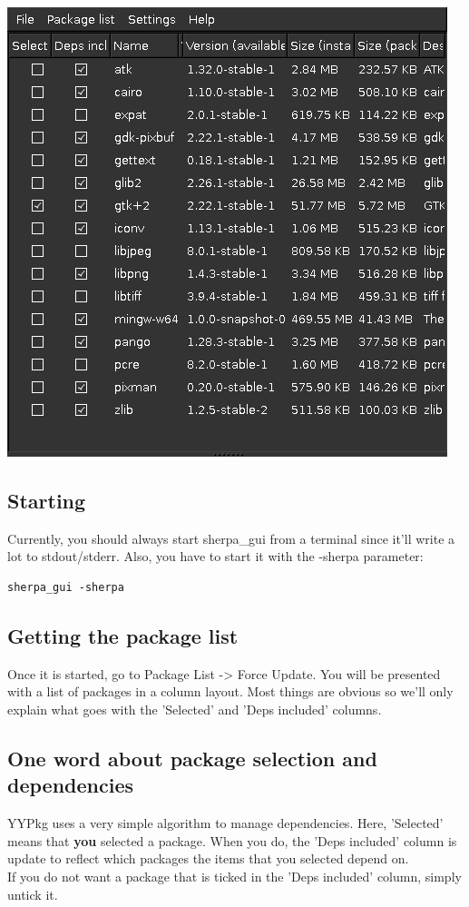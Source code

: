 \documentclass[a4paper]{article}
\begin{document}
\begin{center}
  \includegraphics{../screenshots/sherpa_gui_1.png}
\end{center}

\subsection{Starting}
Currently, you should always start sherpa\_gui from a terminal since it'll write a lot to stdout/stderr. Also, you have to start it with the -sherpa parameter:
\begin{verbatim}
sherpa_gui -sherpa
\end{verbatim}

\subsection{Getting the package list}
Once it is started, go to Package List -> Force Update. You will be presented with a list of packages in a column layout. Most things are obvious so we'll only explain what goes with the 'Selected' and 'Deps included' columns.

\subsection{One word about package selection and dependencies}
YYPkg uses a very simple algorithm to manage dependencies.  Here, 'Selected' means that {\bf you} selected a package. When you do, the 'Deps included' column is update to reflect which packages the items that you selected depend on.\\
If you do not want a package that is ticked in the 'Deps included' column, simply untick it.\\
\end{document}
